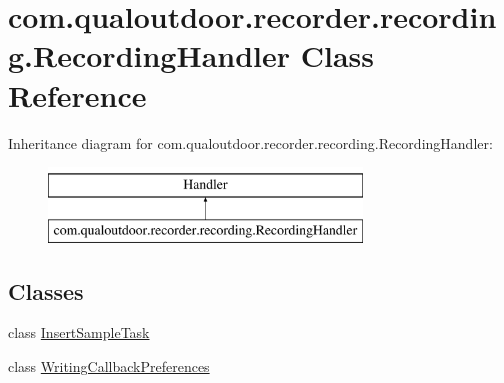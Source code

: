 \hypertarget{classcom_1_1qualoutdoor_1_1recorder_1_1recording_1_1RecordingHandler}{\section{com.\-qualoutdoor.\-recorder.\-recording.\-Recording\-Handler Class Reference}
\label{classcom_1_1qualoutdoor_1_1recorder_1_1recording_1_1RecordingHandler}
}
Inheritance diagram for com.\-qualoutdoor.\-recorder.\-recording.\-Recording\-Handler\-:\begin{figure}[H]
\begin{center}
\leavevmode
\includegraphics[height=2.000000cm]{classcom_1_1qualoutdoor_1_1recorder_1_1recording_1_1RecordingHandler}
\end{center}
\end{figure}
\subsection*{Classes}
\begin{DoxyCompactItemize}
\item 
class \hyperlink{classcom_1_1qualoutdoor_1_1recorder_1_1recording_1_1RecordingHandler_1_1InsertSampleTask}{Insert\-Sample\-Task}
\item 
class \hyperlink{classcom_1_1qualoutdoor_1_1recorder_1_1recording_1_1RecordingHandler_1_1WritingCallbackPreferences}{Writing\-Callback\-Preferences}
\end{DoxyCompactItemize}
